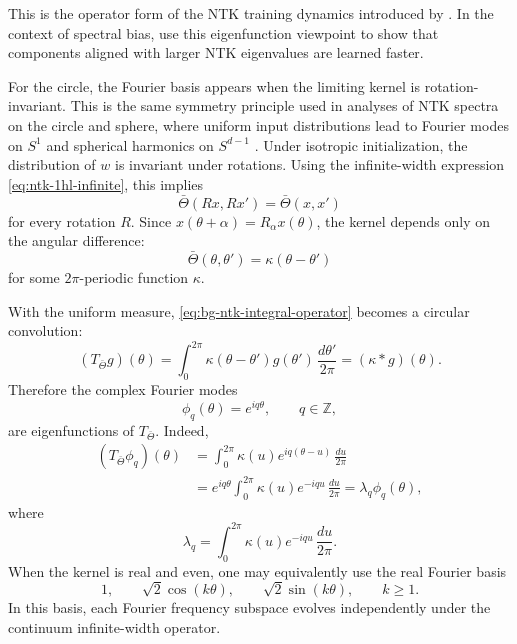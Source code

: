 This is the operator form of the NTK training dynamics introduced by
\citet{jacot2018ntk}. In the context of spectral bias,
\citet{cao2020understandingspectralbiasdeep} use this eigenfunction viewpoint
to show that components aligned with larger NTK eigenvalues are learned faster.

For the circle, the Fourier basis appears when the limiting kernel is
rotation-invariant. This is the same symmetry principle used in analyses of NTK
spectra on the circle and sphere, where uniform input distributions lead to
Fourier modes on \(S^1\) and spherical harmonics on \(S^{d-1}\)
\citep{basri2019convergence,bietti2019inductivebiasneuraltangent,
	cao2020understandingspectralbiasdeep}. Under isotropic initialization, the distribution of \(w\)
is invariant under rotations. Using the infinite-width expression
\eqref{eq:ntk-1hl-infinite}, this implies
\[
	\bar\Theta(Rx,Rx')=\bar\Theta(x,x')
\]
for every rotation \(R\). Since
\(x(\theta+\alpha)=R_\alpha x(\theta)\), the kernel depends only on the angular
difference:
\begin{equation}
	\bar\Theta(\theta,\theta')
	=
	\kappa(\theta-\theta')
	\label{eq:bg-translation-invariant-kernel}
\end{equation}
for some \(2\pi\)-periodic function \(\kappa\).

With the uniform measure, \eqref{eq:bg-ntk-integral-operator} becomes a circular
convolution:
\begin{equation}
	(T_{\bar\Theta}g)(\theta)
	=
	\int_0^{2\pi}
	\kappa(\theta-\theta')g(\theta')
	\,\frac{d\theta'}{2\pi}
	=
	(\kappa*g)(\theta).
	\label{eq:bg-convolution-operator}
\end{equation}
Therefore the complex Fourier modes
\[
	\phi_q(\theta)=e^{iq\theta}, \qquad q\in\mathbb Z,
\]
are eigenfunctions of \(T_{\bar\Theta}\). Indeed,
\begin{align}
	(T_{\bar\Theta}\phi_q)(\theta)
	 & =
	\int_0^{2\pi}
	\kappa(u)e^{iq(\theta-u)}
	\,\frac{du}{2\pi} \\
	 & =
	e^{iq\theta}
	\int_0^{2\pi}
	\kappa(u)e^{-iqu}
	\,\frac{du}{2\pi}
	=
	\lambda_q \phi_q(\theta),
\end{align}
where
\begin{equation}
	\lambda_q
	=
	\int_0^{2\pi}
	\kappa(u)e^{-iqu}
	\,\frac{du}{2\pi}.
	\label{eq:bg-fourier-eigenvalues}
\end{equation}
When the kernel is real and even, one may equivalently use the real Fourier
basis
\[
	1,\qquad
	\sqrt{2}\cos(k\theta),\qquad
	\sqrt{2}\sin(k\theta),\qquad k\ge 1.
\]
In this basis, each Fourier frequency subspace evolves independently under the
continuum infinite-width operator.


